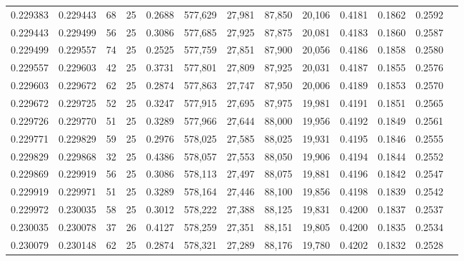 \begin{tabular}{rrrrrrrrrrrrr}
0.229383 & 0.229443 &    68 &  25 &                                     0.2688 & 577,629 &  27,981 &  87,850 &  20,106 & 0.4181 & 0.1862 & 0.2592 \\
0.229443 & 0.229499 &    56 &  25 &                                     0.3086 & 577,685 &  27,925 &  87,875 &  20,081 & 0.4183 & 0.1860 & 0.2587 \\
0.229499 & 0.229557 &    74 &  25 &                                     0.2525 & 577,759 &  27,851 &  87,900 &  20,056 & 0.4186 & 0.1858 & 0.2580 \\
0.229557 & 0.229603 &    42 &  25 &                                     0.3731 & 577,801 &  27,809 &  87,925 &  20,031 & 0.4187 & 0.1855 & 0.2576 \\
0.229603 & 0.229672 &    62 &  25 &                                     0.2874 & 577,863 &  27,747 &  87,950 &  20,006 & 0.4189 & 0.1853 & 0.2570 \\
0.229672 & 0.229725 &    52 &  25 &                                     0.3247 & 577,915 &  27,695 &  87,975 &  19,981 & 0.4191 & 0.1851 & 0.2565 \\
0.229726 & 0.229770 &    51 &  25 &                                     0.3289 & 577,966 &  27,644 &  88,000 &  19,956 & 0.4192 & 0.1849 & 0.2561 \\
0.229771 & 0.229829 &    59 &  25 &                                     0.2976 & 578,025 &  27,585 &  88,025 &  19,931 & 0.4195 & 0.1846 & 0.2555 \\
0.229829 & 0.229868 &    32 &  25 &                                     0.4386 & 578,057 &  27,553 &  88,050 &  19,906 & 0.4194 & 0.1844 & 0.2552 \\
0.229869 & 0.229919 &    56 &  25 &                                     0.3086 & 578,113 &  27,497 &  88,075 &  19,881 & 0.4196 & 0.1842 & 0.2547 \\
0.229919 & 0.229971 &    51 &  25 &                                     0.3289 & 578,164 &  27,446 &  88,100 &  19,856 & 0.4198 & 0.1839 & 0.2542 \\
0.229972 & 0.230035 &    58 &  25 &                                     0.3012 & 578,222 &  27,388 &  88,125 &  19,831 & 0.4200 & 0.1837 & 0.2537 \\
0.230035 & 0.230078 &    37 &  26 &                                     0.4127 & 578,259 &  27,351 &  88,151 &  19,805 & 0.4200 & 0.1835 & 0.2534 \\
0.230079 & 0.230148 &    62 &  25 &                                     0.2874 & 578,321 &  27,289 &  88,176 &  19,780 & 0.4202 & 0.1832 & 0.2528 \\

\end{tabular}

